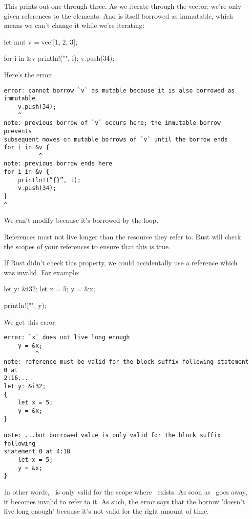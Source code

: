 This prints out one through three. As we iterate through the vector, we're only given references to the elements. And  is 
itself borrowed as immutable, which means we can't change it while we're iterating:

\begin{rustc}
let mut v = vec![1, 2, 3];

for i in &v {
    println!("{}", i);
    v.push(34);
}
\end{rustc}

Here's the error:

\begin{verbatim}
error: cannot borrow `v` as mutable because it is also borrowed as immutable
    v.push(34);
    ^
note: previous borrow of `v` occurs here; the immutable borrow prevents
subsequent moves or mutable borrows of `v` until the borrow ends
for i in &v {
          ^
note: previous borrow ends here
for i in &v {
    println!(“{}”, i);
    v.push(34);
}
^
\end{verbatim}

We can't modify  because it's borrowed by the loop.


References must not live longer than the resource they refer to. Rust will check the scopes of your references to ensure that 
this is true.

\blank

If Rust didn't check this property, we could accidentally use a reference which was invalid. For example:

\begin{rustc}
let y: &i32;
{
    let x = 5;
    y = &x;
}

println!("{}", y);
\end{rustc}

We get this error:

\begin{verbatim}
error: `x` does not live long enough
    y = &x;
         ^
note: reference must be valid for the block suffix following statement 0 at
2:16...
let y: &i32;
{
    let x = 5;
    y = &x;
}

note: ...but borrowed value is only valid for the block suffix following
statement 0 at 4:18
    let x = 5;
    y = &x;
}
\end{verbatim}

In other words, \y\ is only valid for the scope where \x\ exists. As soon as \x\ goes away, it becomes invalid to 
refer to it. As such, the error says that the borrow 'doesn't live long enough' because it's not valid for the right amount of time.

